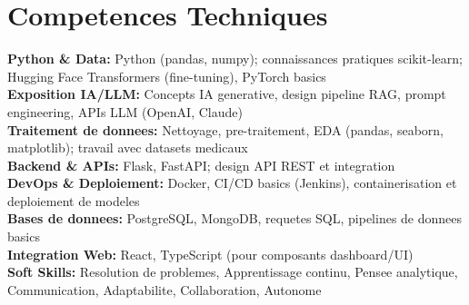 \documentclass[10pt,a4paper]{article}
\begin{document}
\section*{Competences Techniques}
{\small
\textbf{Python \& Data:} Python (pandas, numpy); connaissances pratiques scikit-learn; Hugging Face Transformers (fine-tuning), PyTorch basics\\[2pt]
\textbf{Exposition IA/LLM:} Concepts IA generative, design pipeline RAG, prompt engineering, APIs LLM (OpenAI, Claude)\\[2pt]
\textbf{Traitement de donnees:} Nettoyage, pre-traitement, EDA (pandas, seaborn, matplotlib); travail avec datasets medicaux\\[2pt]
\textbf{Backend \& APIs:} Flask, FastAPI; design API REST et integration\\[2pt]
\textbf{DevOps \& Deploiement:} Docker, CI/CD basics (Jenkins), containerisation et deploiement de modeles\\[2pt]
\textbf{Bases de donnees:} PostgreSQL, MongoDB, requetes SQL, pipelines de donnees basics\\[2pt]
\textbf{Integration Web:} React, TypeScript (pour composants dashboard/UI)\\[2pt]
\textbf{Soft Skills:} Resolution de problemes, Apprentissage continu, Pensee analytique, Communication, Adaptabilite, Collaboration, Autonome
}

\vspace{6pt}

\end{document}
